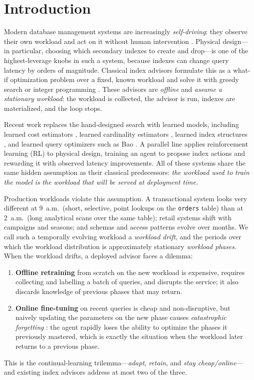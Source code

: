 \section{Introduction}

Modern database management systems are increasingly \emph{self-driving}: they
observe their own workload and act on it without human intervention
\citep{pavlo2017selfdriving}. Physical design---in particular, choosing which
secondary indexes to create and drop---is one of the highest-leverage knobs in
such a system, because indexes can change query latency by orders of magnitude.
Classical index advisors formulate this as a what-if optimization problem over a
fixed, known workload and solve it with greedy search or integer programming
\citep{chaudhuri1997autoadmin,valentin2000db2advisor,zilio2004db2design}. These
advisors are \emph{offline} and \emph{assume a stationary workload}: the workload
is collected, the advisor is run, indexes are materialized, and the loop stops.

Recent work replaces the hand-designed search with learned models, including
learned cost estimators \citep{marcus2019learnedcost}, learned cardinality
estimators \citep{kipf2019learnedcardinalities}, learned index structures
\citep{kraska2018case}, and learned query optimizers such as Bao
\citep{marcus2021bao}. A parallel line applies reinforcement learning (RL) to
physical design, training an agent to propose index actions and rewarding it with
observed latency improvements. All of these systems share the same hidden
assumption as their classical predecessors: \emph{the workload used to train the
model is the workload that will be served at deployment time.}

Production workloads violate this assumption. A transactional system looks very
different at 9~a.m.\ (short, selective, point lookups on the \texttt{orders}
table) than at 2~a.m.\ (long analytical scans over the same table); retail
systems shift with campaigns and seasons; and schemas and access patterns evolve
over months. We call such a temporally evolving workload a \emph{workload drift},
and the periods over which the workload distribution is approximately stationary
\emph{workload phases}. When the workload drifts, a deployed advisor faces a
dilemma:
\begin{enumerate}
  \item \textbf{Offline retraining} from scratch on the new workload is
    expensive, requires collecting and labelling a batch of queries, and
    disrupts the service; it also discards knowledge of previous phases that may
    return.
  \item \textbf{Online fine-tuning} on recent queries is cheap and
    non-disruptive, but naively updating the parameters on the new phase causes
    \emph{catastrophic forgetting} \citep{mccloskey1989catastrophic}: the agent
    rapidly loses the ability to optimize the phases it previously mastered,
    which is exactly the situation when the workload later returns to a previous
    phase.
\end{enumerate}
This is the continual-learning trilemma---\emph{adapt}, \emph{retain}, and
\emph{stay cheap/online}---and existing index advisors address at most two of the
three.

